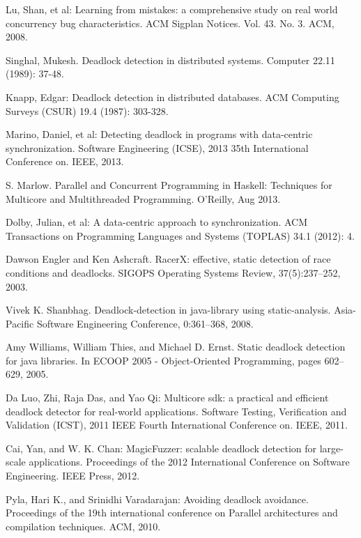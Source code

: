 \begin{thebibliography}{4}

 Lu, Shan, et al: Learning from mistakes: a comprehensive study on real world concurrency bug characteristics.
ACM Sigplan Notices. Vol. 43. No. 3. ACM, 2008.

 Singhal, Mukesh. Deadlock detection in distributed systems.
Computer 22.11 (1989): 37-48.

 Knapp, Edgar: Deadlock detection in distributed databases.
ACM Computing Surveys (CSUR) 19.4 (1987): 303-328.

 Marino, Daniel, et al: Detecting deadlock in programs with data-centric synchronization.
Software Engineering (ICSE), 2013 35th International Conference on. IEEE, 2013.

 S. Marlow. Parallel and Concurrent Programming in Haskell: Techniques for Multicore and Multithreaded Programming. O'Reilly, Aug 2013.

 Dolby, Julian, et al: A data-centric approach to synchronization.
ACM Transactions on Programming Languages and Systems (TOPLAS) 34.1 (2012): 4.

 Dawson Engler and Ken Ashcraft. RacerX: effective, static detection of race conditions and
deadlocks. SIGOPS Operating Systems Review, 37(5):237–252, 2003.

 Vivek K. Shanbhag. Deadlock-detection in java-library using static-analysis. Asia-Pacific
Software Engineering Conference, 0:361–368, 2008.

 Amy Williams, William Thies, and Michael D. Ernst. Static deadlock detection for java
libraries. In ECOOP 2005 - Object-Oriented Programming, pages 602–629, 2005.

 Da Luo, Zhi, Raja Das, and Yao Qi: Multicore sdk: a practical and efficient deadlock detector for real-world applications.
Software Testing, Verification and Validation (ICST), 2011 IEEE Fourth International Conference on. IEEE, 2011.

 Cai, Yan, and W. K. Chan: MagicFuzzer: scalable deadlock detection for large-scale applications.
Proceedings of the 2012 International Conference on Software Engineering. IEEE Press, 2012.

 Pyla, Hari K., and Srinidhi Varadarajan: Avoiding deadlock avoidance.
Proceedings of the 19th international conference on Parallel architectures and compilation techniques. ACM, 2010.


\end{thebibliography}
